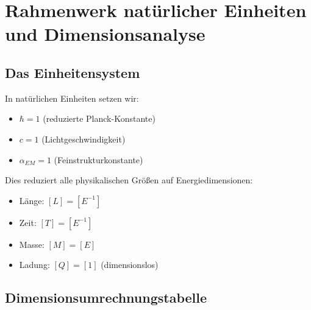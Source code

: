 \documentclass[12pt,a4paper]{article}
\begin{document}
	\tableofcontents
	\newpage
	
	\section{Rahmenwerk natürlicher Einheiten und Dimensionsanalyse}
	\label{sec:natural_units}
	
	\subsection{Das Einheitensystem}
	\label{subsec:unit_system}
	
	In natürlichen Einheiten setzen wir:
	\begin{itemize}
		\item $\hbar = 1$ (reduzierte Planck-Konstante)
		\item $c = 1$ (Lichtgeschwindigkeit)
		\item $\alpha_{EM} = 1$ (Feinstrukturkonstante)
	\end{itemize}
	
	Dies reduziert alle physikalischen Größen auf Energiedimensionen:
	
	\begin{tcolorbox}[colback=blue!5!white,colframe=blue!75!black,title=Dimensionen in natürlichen Einheiten]
		\begin{itemize}
			\item Länge: $[L] = [E^{-1}]$
			\item Zeit: $[T] = [E^{-1}]$ 
			\item Masse: $[M] = [E]$
			\item Ladung: $[Q] = [1]$ (dimensionslos)
		\end{itemize}
	\end{tcolorbox}
	
	\subsection{Dimensionsumrechnungstabelle}
	
\end{document}
